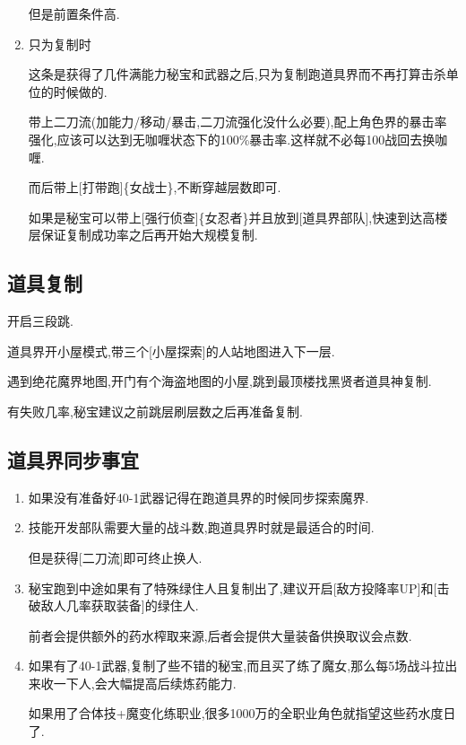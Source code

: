 \begin{enumerate}
		但是前置条件高.

		\item
		只为复制时

		这条是获得了几件满能力秘宝和武器之后,只为复制跑道具界而不再打算击杀单位的时候做的.

		带上二刀流(加能力/移动/暴击,二刀流强化没什么必要),配上角色界的暴击率强化,应该可以达到无咖喱状态下的100\%暴击率.这样就不必每100战回去换咖喱.

		而后带上[打带跑]\{女战士\},不断穿越层数即可.

		如果是秘宝可以带上[强行侦查]\{女忍者\}并且放到[道具界部队],快速到达高楼层保证复制成功率之后再开始大规模复制.

	\end{enumerate}

	\subsection{道具复制}

	开启三段跳.

	道具界开小屋模式,带三个[小屋探索]的人站地图进入下一层.

	遇到绝花魔界地图,开门有个海盗地图的小屋,跳到最顶楼找黑贤者道具神复制.

	有失败几率,秘宝建议之前跳层刷层数之后再准备复制.

	\subsection{道具界同步事宜}

	\begin{enumerate}
		\item
		如果没有准备好40-1武器记得在跑道具界的时候同步探索魔界.

		\item
		技能开发部队需要大量的战斗数,跑道具界时就是最适合的时间.

		但是获得[二刀流]即可终止换人.

		\item
		秘宝跑到中途如果有了特殊绿住人且复制出了,建议开启[敌方投降率UP]和[击破敌人几率获取装备]的绿住人.

		前者会提供额外的药水榨取来源,后者会提供大量装备供换取议会点数.

		\item
		如果有了40-1武器,复制了些不错的秘宝,而且买了练了魔女,那么每5场战斗拉出来收一下人,会大幅提高后续炼药能力.

		如果用了合体技+魔变化练职业,很多1000万的全职业角色就指望这些药水度日了.

	\end{enumerate}


